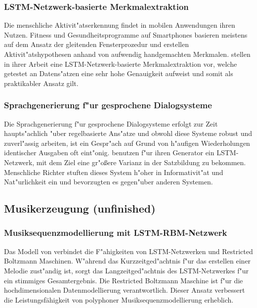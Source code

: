 {\subsubsection{LSTM-Netzwerk-basierte Merkmalextraktion}
Die menschliche Aktivit"atserkennung findet in mobilen Anwendungen ihren Nutzen. Fitness und Gesundheitsprogramme auf Smartphones basieren meistens auf dem Ansatz der gleitenden Fensterprozedur und erstellen Aktivit"atshypothesen anhand von aufwendig handgemachten Merkmalen. \cite{Chen} stellen in ihrer Arbeit eine LSTM-Netzwerk-basierte Merkmalextraktion vor, welche getestet an Datens"atzen eine sehr hohe Genauigkeit aufweist und somit als praktikabler Ansatz gilt.

\subsubsection{Sprachgenerierung f"ur gesprochene Dialogsysteme}
Die Sprachgenerierung f"ur gesprochene Dialogsysteme erfolgt zur Zeit haupts"achlich "uber regelbasierte Ans"atze und obwohl diese Systeme robust und zuverl"assig arbeiten, ist ein Gespr"ach auf Grund von h"aufigen Wiederholungen identischer Ausgaben oft eint"onig. \cite{Wen} benutzen f"ur ihren Generator ein LSTM-Netzwerk, mit dem Ziel eine gr"o{\ss}ere Varianz in der Satzbildung zu bekommen. Menschliche Richter stuften dieses System h"oher in Informativit"at und Nat"urlichkeit ein und bevorzugten es gegen"uber anderen Systemen.


\subsection{Musikerzeugung (unfinished)}

\subsubsection{Musiksequenzmodellierung mit LSTM-RBM-Netzwerk}
Das Modell von \cite{Lyu} verbindet die F"ahigkeiten von LSTM-Netzwerken und Restricted Boltzmann Maschinen. W"ahrend das Kurzzeitged"achtnis f"ur das erstellen einer Melodie zust"andig ist, sorgt das Langzeitged"achtnis des LSTM-Netzwerkes f"ur ein stimmiges Gesamtergebnis. Die Restricted Boltzmann Maschine ist f"ur die hochdimensionalen Datenmodellierung verantwortlich. Dieser Ansatz verbessert die Leistungsfähigkeit von polyphoner Musiksequenzmodellierung erheblich.

}

